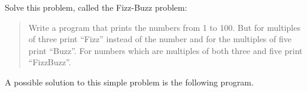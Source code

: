 \begin{Exercise}[title={FizzBuzz},difficulty=1]
\label{ex:fizzbuzz}
\Question \label{ex:fizzbuzz q1} Solve this problem, called
the Fizz-Buzz \cite{fizzbuzz} problem:
\begin{quote}
Write a program that prints the numbers from 1 to 100. But for multiples
of three print ``Fizz'' instead of the number and for the multiples of
five print ``Buzz''. For numbers which are multiples of both three and
five print ``FizzBuzz''.
\end{quote}
\end{Exercise}

\begin{Answer}
\Question A possible
solution to this simple problem is the following program.

\showremarks
\end{Answer}

